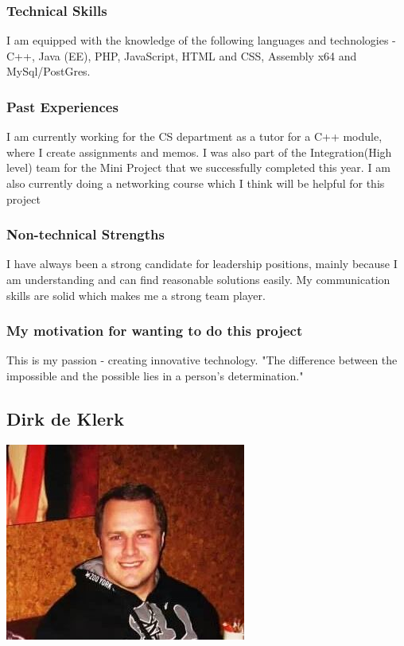 \documentclass[a4paper,12pt]{article}
\begin{document}
			\subsubsection{Technical Skills}
			I am equipped with the knowledge of the following languages and technologies - C++, Java (EE), PHP, JavaScript, HTML and CSS, Assembly x64 and MySql/PostGres.
			\subsubsection{Past Experiences}
			I am currently working for the CS department as a tutor for a C++ module, where I create assignments and memos. I was also part of the Integration(High level) team for the Mini Project that we successfully completed this year. I am also currently doing a networking course which I think will be helpful for this project  
			\subsubsection{Non-technical Strengths}
			I have always been a strong candidate for leadership positions, mainly because I am understanding and can find reasonable solutions easily. My communication skills are solid which makes me a strong team player.
			\subsubsection{My motivation for wanting to do this project}
			This is my passion - creating innovative technology. "The difference between the impossible and the possible lies in a person's determination."
		
		\newpage
		\subsection{Dirk de Klerk}
		\includegraphics[scale=0.8]{./Pictures/dirk.jpg}\\
\end{document}
